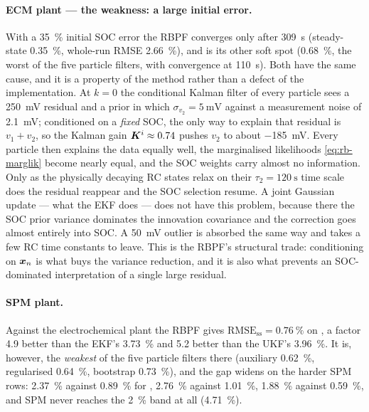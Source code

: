\paragraph{ECM plant --- the weakness: a large initial error.}
With a \SI{35}{\percent} initial SOC error the RBPF converges only after \SI{309}{\second}
(steady-state \SI{0.35}{\percent}, whole-run RMSE \SI{2.66}{\percent}), and  is its
other soft spot (\SI{0.68}{\percent}, the worst of the five particle filters, with convergence at
\SI{110}{\second}).  Both have the same cause, and it is a property of the method rather than a
defect of the implementation.  At $k=0$ the conditional Kalman filter of every particle sees a
\SI{250}{\milli\volt} residual and a prior in which $\sigma_{v_2} = \SI{5}{\milli\volt}$ against a
measurement noise of \SI{2.1}{\milli\volt}; conditioned on a \emph{fixed} SOC, the only way to
explain that residual is $v_1 + v_2$, so the Kalman gain $\bm{K}^i \approx \num{0.74}$ pushes $v_2$ to
about \SI{-185}{\milli\volt}.  Every particle then explains the data equally well, the marginalised
likelihoods \eqref{eq:rb-marglik} become nearly equal, and the SOC weights carry almost no
information.  Only as the physically decaying RC states relax on their $\tau_2 = \SI{120}{\second}$
time scale does the residual reappear and the SOC selection resume.  A joint Gaussian update --- what
the EKF does --- does not have this problem, because there the SOC prior variance dominates the
innovation covariance and the correction goes almost entirely into SOC.  A \SI{50}{\milli\volt}
outlier is absorbed the same way and takes a few RC time constants to leave.  This is the RBPF's
structural trade: conditioning on $\bm{x}_n$ is what buys the variance reduction, and it is also what
prevents an SOC-dominated interpretation of a single large residual.

\paragraph{SPM plant.}  Against the electrochemical plant the RBPF gives
$\mathrm{RMSE}_{\mathrm{ss}} = \SI{0.76}{\percent}$ on , a factor \num{4.9} better
than the EKF's \SI{3.73}{\percent} and \num{5.2} better than the UKF's \SI{3.96}{\percent}.  It is,
however, the \emph{weakest} of the five particle filters there (auxiliary \SI{0.62}{\percent},
regularised \SI{0.64}{\percent}, bootstrap \SI{0.73}{\percent}), and the gap widens on the harder
SPM rows:  \SI{2.37}{\percent} against \SI{0.89}{\percent} for
,  \SI{2.76}{\percent} against \SI{1.01}{\percent},
 \SI{1.88}{\percent} against \SI{0.59}{\percent}, and SPM  never reaches
the \SI{2}{\percent} band at all (\SI{4.71}{\percent}).

